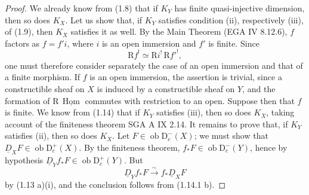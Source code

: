 \documentclass[11pt,a4paper]{article}
\newcommand{\D}{\mathrm{D}}
\newcommand{\ob}{\operatorname{ob}}
\DeclareMathOperator{\Hom}{Hom}
\newcommand{\RHom}{\mathrm{R}\,\underline{\Hom}}
\newcommand{\Ddual}{\underline{D}}
\theoremstyle{plain}
\theoremstyle{definition}
\begin{document}
\begin{proof}
We already know from (1.8) that if $K_Y$ has finite quasi-injective dimension, then so does $K_X$. Let us show that, if $K_Y$ satisfies condition (ii), respectively (iii), of (1.9), then $K_X$ satisfies it as well. By the Main Theorem (EGA IV 8.12.6), $f$ factors as $f=f'i$, where $i$ is an open immersion and $f'$ is finite. Since
\[
\mathrm Rf^!\simeq \mathrm Ri^!\,\mathrm Rf'^!,
\]
one must therefore consider separately the case of an open immersion and that of a finite morphism. If $f$ is an open immersion, the assertion is trivial, since a constructible sheaf on $X$ is induced by a constructible sheaf on $Y$, and the formation of $\RHom$ commutes with restriction to an open. Suppose then that $f$ is finite. We know from (1.14) that if $K_Y$ satisfies (iii), then so does $K_X$, taking account of the finiteness theorem SGA A IX 2.14. It remains to prove that, if $K_Y$ satisfies (ii), then so does $K_X$. Let $F\in\ob\D_c^-(X)$; we must show that $\Ddual_XF\in\ob\D_c^+(X)$. By the finiteness theorem, $f_*F\in\ob\D_c^-(Y)$, hence by hypothesis $\Ddual_Yf_*F\in\ob\D_c^+(Y)$. But
\[
\Ddual_Yf_*F\xrightarrow{\sim}f_*\Ddual_XF
\]
by (1.13 a)(i), and the conclusion follows from (1.14.1 b).
\end{proof}

\bigskip
\end{document}
